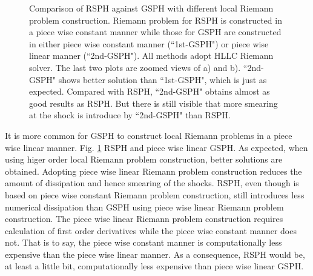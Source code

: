 \begin{figure}[H]
\begin{minipage}{.545\textwidth}
\begin{flushleft}
        \end{flushleft}
    \end{minipage}%
    \caption{Comparison of RSPH against GSPH with different local Riemann problem construction. Riemann problem for RSPH is constructed in a piece wise constant manner while those for GSPH are constructed in either piece wise constant manner (``1st-GSPH") or piece wise linear manner (``2nd-GSPH"). All methods adopt HLLC Riemann solver. The last two plots are zoomed views of a) and b). ``2nd-GSPH" shows better solution than ``1st-GSPH", which is just as expected. Compared with RSPH, ``2nd-GSPH" obtains almost as good results as RSPH. But there is still visible that more smearing at the shock is introduce by ``2nd-GSPH" than RSPH.}
    \label{fig:RCM-Sod-GSPH2}
\end{figure}

It is more common for GSPH to construct local Riemann problems in a piece wise linear manner. Fig. \ref{fig:RCM-Sod-GSPH2} RSPH and piece wise linear GSPH. As expected, when using higer order local Riemann problem construction, better solutions are obtained. Adopting piece wise linear Riemann problem construction reduces the amount of dissipation and hence smearing of the shocks. RSPH, even though is based on piece wise constant Riemann problem construction, still introduces less numerical dissipation than GSPH using piece wise linear Riemann problem construction. The piece wise linear Riemann problem construction requires calculation of first order derivatives while the piece wise constant manner does not. That is to say, the piece wise constant manner is computationally less expensive than the piece wise linear manner. As a consequence, RSPH would be, at least a little bit, computationally less expensive than piece wise linear GSPH.

